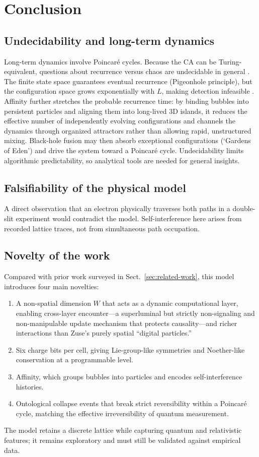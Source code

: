 \documentclass{ijuc}
\begin{document}
\section{Conclusion\label{sec:Discussion}}
\subsection{Undecidability and long-term dynamics}\label{sec-undecidability}
Long-term dynamics involve Poincar\'{e} cycles. Because the CA can be Turing-equivalent, questions about recurrence versus chaos are undecidable in general \cite{wolfram1983,gacs1979}. The finite state space guarantees eventual recurrence (Pigeonhole principle), but the configuration space grows exponentially with $L$, making detection infeasible \cite{bernstein2007,toffoli1980}. Affinity further stretches the probable recurrence time: by binding bubbles into persistent particles and aligning them into long-lived 3D islands, it reduces the effective number of independently evolving configurations and channels the dynamics through organized attractors rather than allowing rapid, unstructured mixing. Black-hole fusion may then absorb exceptional configurations (`Gardens of Eden') and drive the system toward a Poincar\'{e} cycle. Undecidability limits algorithmic predictability, so analytical tools are needed for general insights.
\subsection{Falsifiability of the physical model}
A direct observation that an electron physically traverses both paths in a double-slit experiment would contradict the model. Self-interference here arises from recorded lattice traces, not from simultaneous path occupation.
\subsection{Novelty of the work}
Compared with prior work surveyed in Sect.~\ref{sec:related-work}, this model introduces four main novelties:
\begin{enumerate}
\item A non-spatial dimension $W$ that acts as a dynamic computational layer, enabling cross-layer encounter---a superluminal but strictly non-signaling and non-manipulable update mechanism that protects causality---and richer interactions than Zuse's purely spatial ``digital particles.''
\item Six charge bits per cell, giving Lie-group-like symmetries and Noether-like conservation at a programmable level.
\item Affinity, which groups bubbles into particles and encodes self-interference histories.
\item Ontological collapse events that break strict reversibility within a Poincar\'{e} cycle, matching the effective irreversibility of quantum measurement.
\end{enumerate}
The model retains a discrete lattice while capturing quantum and relativistic features; it remains exploratory and must still be validated against empirical data.
\end{document}
